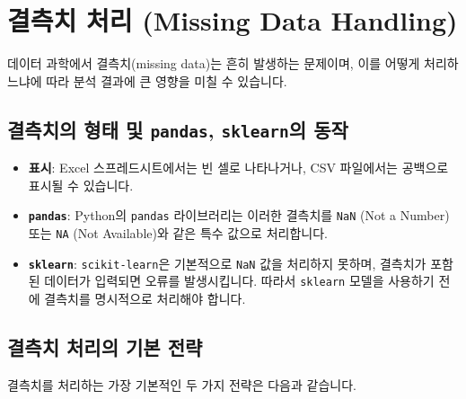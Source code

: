 \documentclass[11pt,a4paper]{article}
\theoremstyle{definition}
\newcommand{\newsection}[1]{\newpage\section{#1}}
\begin{document}
\newsection{결측치 처리 (Missing Data Handling)}

데이터 과학에서 결측치(missing data)는 흔히 발생하는 문제이며, 이를 어떻게 처리하느냐에 따라 분석 결과에 큰 영향을 미칠 수 있습니다.

\subsection*{결측치의 형태 및 \texttt{pandas}, \texttt{sklearn}의 동작}
\begin{itemize}
    \item \textbf{표시}: Excel 스프레드시트에서는 빈 셀로 나타나거나, CSV 파일에서는 공백으로 표시될 수 있습니다.
    \item \textbf{\texttt{pandas}}: Python의 \texttt{pandas} 라이브러리는 이러한 결측치를 \texttt{NaN} (Not a Number) 또는 \texttt{NA} (Not Available)와 같은 특수 값으로 처리합니다.
    \item \textbf{\texttt{sklearn}}: \texttt{scikit-learn}은 기본적으로 \texttt{NaN} 값을 처리하지 못하며, 결측치가 포함된 데이터가 입력되면 오류를 발생시킵니다. 따라서 \texttt{sklearn} 모델을 사용하기 전에 결측치를 명시적으로 처리해야 합니다.
\end{itemize}

\subsection*{결측치 처리의 기본 전략}
결측치를 처리하는 가장 기본적인 두 가지 전략은 다음과 같습니다.
\end{document}
